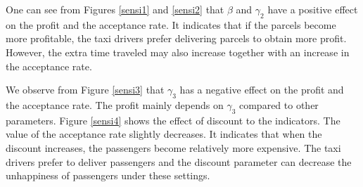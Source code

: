 \documentclass[preprint,authoryear,12pt]{elsarticle}
\begin{document}
One can see from Figures \ref{sensi1} and \ref{sensi2} that $\beta$ and $\gamma_2$ have a positive effect on the profit and the acceptance rate. It indicates that if the parcels become more profitable, the taxi drivers prefer delivering parcels to obtain more profit. However, the extra time traveled may also increase together with an increase in the acceptance rate. 

We observe from Figure \ref{sensi3} that $\gamma_3$ has a negative effect on the profit and the acceptance rate. The profit mainly depends on $\gamma_3$ compared to other parameters. Figure \ref{sensi4} shows the effect of discount to the indicators. The value of the acceptance rate slightly decreases. It indicates that when the discount increases, the passengers become relatively more expensive. The taxi drivers prefer to deliver passengers and the discount parameter can decrease the unhappiness of passengers under these settings. 
\end{document}
